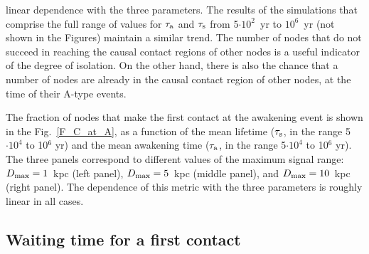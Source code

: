 \documentclass[crop]{CSLB}
\newcommand{\cetis}{nodes}
\newcommand{\ffn}[1]{}
\begin{document}
linear dependence with the three parameters.
%
The results of the simulations that comprise the full range of values
for $\tau_{\rm a}$ and $\tau_{\rm s}$ from 5$\cdot10^2$~yr to $10^6$~yr
(not shown in the Figures) maintain a similar trend.
%
The number of \cetis{} that do not succeed in reaching the causal
contact regions of other nodes is a useful indicator of the degree of
isolation.
%
On the other hand, there is also the chance that a number of \cetis{}
are already in the causal contact region of other nodes, at the time
of their A-type events.
%
\ffn{5}
%
The fraction of \cetis{} that make the first contact at the awakening
event is shown in the Fig.~\ref{F_C_at_A}, as a function of the mean
lifetime ($\tau_{\rm s}$, in the range 5$\cdot 10^4$ to 10$^6$ yr) and
the mean awakening time ($\tau_{\rm a}$, in the range 5$\cdot 10^4$ to
10$^6$ yr).
%
The three panels correspond to different values of the maximum signal
range:
%
$D_{\rm max}=1$~kpc (left panel), $D_{\rm max}=5$~kpc (middle panel),
and $D_{\rm max}=10$~kpc (right panel).
%
The dependence of this metric with the three parameters is roughly
linear in all cases.



\subsection{Waiting time for a first contact}\label{SS_waiting}
\end{document}
